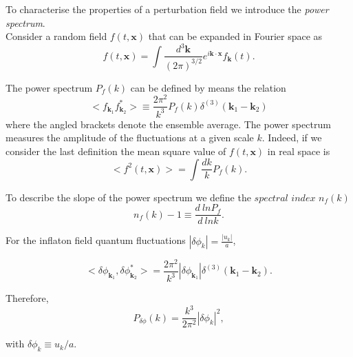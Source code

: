 \documentclass[11pt,a4paper,twoside]{book}
\begin{document}
To characterise the properties  of a perturbation field we introduce the \textit{power spectrum}.\\
Consider a random field $ f(t,\textbf{x}) $ that can be expanded in Fourier space as 
\begin{equation}
\label{fourierTransform}
	f(t,\textbf{x}) = \int \frac{d^{3}\textbf{k}}{(2\pi)^{3/2}} e^{i\textbf{k}\cdot \textbf{x}} f_{\textbf{k}}(t).
\end{equation}

The power spectrum $ P_{f}(k) $ can be defined by means the relation
\begin{equation}
\label{powerSpectrum}
\big<f_{\textbf{k}_{1}}f^{*}_{\textbf{k}_{2}}\big> \equiv \frac{2\pi^{2}}{k^{3}}P_{f}(k) \delta^{(3)}(\textbf{k}_{1}-\textbf{k}_{2})
\end{equation}
where the angled brackets denote the ensemble average. The power spectrum measures the amplitude of the fluctuations at a given scale $k$. Indeed, if we consider the last definition the mean square value of $f(t,\textbf{x})$ in real space is
\begin{equation}
\label{meanSquare}	
\big<f^{2}(t,\textbf{x})\big>= \int \frac{dk}{k} P_{f}(k).
\end{equation}

To describe the slope of the power spectrum  we define the $ \textit{spectral index}$   $n_{f}(k)$
\begin{equation}
\label{spectralIndex}
n_{f}(k) - 1 \equiv \frac{d \ lnP_{f}}{d \ ln k}.
\end{equation}  

For the inflaton field quantum fluctuations $ |\delta \phi_{k}| = \frac{|u_{k}|}{a} $,

\begin{equation}
	\label{fluctuations}
	\big < \delta\phi_{\textbf{k}_{1}}, \delta \phi^{*}_{\textbf{k}_{2}}\big>=\frac{2\pi^{2}}{k^{3}}|\delta \phi_{\textbf{k}_{1}}| \delta^{(3)}(\textbf{k}_{1}-\textbf{k}_{2}).
\end{equation}

Therefore,
\begin{equation}
\label{spectrumFluctuation}
P_{\delta \phi}(k) = \frac{k^{3}}{2\pi^{2}}|\delta \phi_{k}|^{2},		
\end{equation}

with $ \delta \phi_{k} \equiv u_{k}/a $.	
\end{document}
